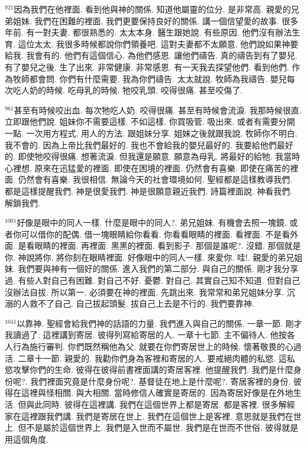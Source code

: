 \documentclass{book}
\begin{document}
$^{921}$因為我們在他裡面.
看到他與神的關係.
知道他屬靈的位分.
是非常高.
親愛的兄弟姐妹.
我們在困難的裡面.
我們更要保持良好的關係.
講一個信望愛的故事.
很多年前.
有一對夫妻.
都很熟悉的.
太太本身.
醫生跟她說.
有些原因.
他們沒有辦法生育.
這位太太.
我很多時候都說你們領養吧.
這對夫妻都不太願意.
他們說如果神要給我.
我會有的.
他們有這個信心.
為他們感恩.
讓他們禱告.
真的禱告到有了嬰兒.
有了嬰兒之後.
生了出來.
非常健康.
非常感恩.
有一天我去探望他們.
看到他們.
作為牧師都會問.
你們有什麼需要.
我為你們禱告.
太太就說.
牧師為我禱告.
嬰兒每次吃人奶的時候.
吃母乳的時候.
牠咬乳頭.
咬得很痛.
甚至咬傷了.

$^{961}$甚至有時候咬出血.
每次牠吃人奶.
咬得很痛.
甚至有時候會流淚.
我那時候很直.
立即跟他們說.
姐妹你不需要這樣.
不如這樣.
你買吸管.
吸出來.
或者有需要分開一點.
一次用方程式.
用人的方法.
跟姐妹分享.
姐妹之後就跟我說.
牧師你不明白.
我不會的.
因為上帝比我們最好的.
我也不會給我的嬰兒最好的.
我要給他們最好的.
即使牠咬得很痛.
想著流淚.
但我還是願意.
願意為母乳.
將最好的給牠.
我當時心裡想.
原來在迅猛愛的裡面.
即使在困境的裡面.
仍然會有喜樂.
即使在痛苦的裡面.
仍然會有喜樂.
我很相信.
無論今天的社會環境如何.
聖經都是這樣教導我們.
都是這樣提醒我們.
神是很愛我們.
神是很願意親近我們.
詩篇裡面說.
神看我們.
解鎖我們.

$^{1001}$好像是眼中的同人一樣.
什麼是眼中的同人?.
弟兄姐妹.
有機會去照一塊鏡.
或者你可以借你的配偶.
借一塊眼睛給你看看.
你看看眼睛的裡面.
看裡面.
不是看外面.
是看眼睛的裡面.
再裡面.
黑黑的裡面.
看到影子.
那個是誰呢?.
沒錯.
那個就是你.
神說將你.
將你刻在眼睛裡面.
好像眼中的同人一樣.
來愛你.
哇!.
親愛的弟兄姐妹.
我們要與神有一個好的關係.
進入我們的第二部分.
與自己的關係.
剛才我分享過.
有些人對自己有困難.
對自己不好.
憂鬱.
對自己.
其實自己知不知道.
但對自己沒辦法自拔.
所以第一.
必須要在神的裡面.
先跳出來.
我常常和弟兄姐妹分享.
沉溺的人救不了自己.
自己拔起頭髮.
拔自己上去是不行的.
我們要靠神.

$^{1041}$以靠神.
聖經會給我們神的話語的力量.
我們進入與自己的關係.
一章一節.
剛才我讀過了.
這裡講到寄居.
彼得列寫給寄居的人.
一章十七節.
主不偏待人.
他按各人行為施行審判.
你們既然稱他為父.
就要在你們寄居世上的時候.
懷著敬畏的心過活.
二章十一節.
親愛的.
我勸你們身為客裡和寄居的人.
要戒絕肉體的私慾.
這私慾攻擊你們的生命.
彼得在彼得前書裡面講的寄居客裡.
他提醒我們.
我們是什麼身份呢?.
我們裡面究竟是什麼身份呢?.
基督徒在地上是什麼呢?.
寄居客裡的身份.
彼得在這裡與怪相關.
與大相關.
當時修信人確實是寄居的.
因為寄居好像是在外地生活.
但與此同時.
彼得在這裡講.
我們在這個世界上都是寄居.
都是客裡.
很多解經家在這裡跟我們講.
我們是寄居在世上.
我們在這個世上是客裡.
意思就是我們在世上.
但不是屬於這個世界上.
我們是入世而不屬世.
我們是在世而不世俗.
彼得就是用這個角度.
\end{document}
